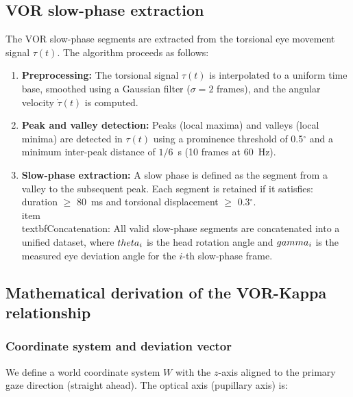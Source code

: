 \documentclass[review,numbers,sort&compress]{elsarticle}
\begin{document}
\subsection{VOR slow-phase extraction}

The VOR slow-phase segments are extracted from the torsional eye movement signal $\tau(t)$. The algorithm proceeds as follows:

\begin{enumerate}
    \item \textbf{Preprocessing:} The torsional signal $\tau(t)$ is interpolated to a uniform time base, smoothed using a Gaussian filter ($\sigma=2$ frames), and the angular velocity $\dot{\tau}(t)$ is computed.
    \item \textbf{Peak and valley detection:} Peaks (local maxima) and valleys (local minima) are detected in $\tau(t)$ using a prominence threshold of 0.5$^\circ$ and a minimum inter-peak distance of $1/6$~s (10 frames at 60~Hz).
    \item \textbf{Slow-phase extraction:} A slow phase is defined as the segment from a valley to the subsequent peak. Each segment is retained if it satisfies: duration $\geq$ 80~ms and torsional displacement $\geq$ 0.3$^\circ$.
    \\item \\textbf{Concatenation:} All valid slow-phase segments are concatenated into a unified dataset, where $\\theta_i$ is the head rotation angle and $\\gamma_i$ is the measured eye deviation angle for the $i$-th slow-phase frame.
\end{enumerate}

\subsection{Mathematical derivation of the VOR-Kappa relationship}

\subsubsection{Coordinate system and deviation vector}

We define a world coordinate system $W$ with the $z$-axis aligned to the primary gaze direction (straight ahead). The optical axis (pupillary axis) is:
\end{document}
